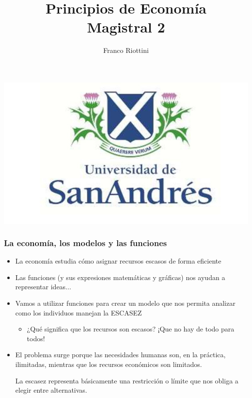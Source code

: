 \documentclass{beamer}
\title[Principios de Economía]{Principios de Economía \vspace{4mm}
\\ Magistral 2}
\date{}
\author[Franco Riottini]{Franco Riottini}
\institute[]{Universidad de San Andrés}
\begin{document}
\begin{frame}
\titlepage
\centering
\includegraphics[scale=0.2]{../Figures/logoUDESA.jpg} 
\end{frame}


\begin{frame}
\frametitle{La economía, los modelos y las funciones}
\begin{itemize}
    \item La economía estudia cómo asignar recursos escasos de forma eficiente
    \item Las funciones (y sus expresiones matemáticas y gráficas) nos ayudan a representar ideas...
    \item Vamos a utilizar funciones para crear un modelo que nos permita analizar como los individuos manejan la ESCASEZ 
    \begin{itemize}
        \item ¿Qué significa que los recursos son escasos? ¡Que no hay de todo para todos!
    \end{itemize}
    \item El problema surge porque las necesidades humanas son, en la práctica, ilimitadas, mientras que los recursos económicos son limitados. 
    \begin{boxA}
        \begin{center}
        
            La escasez representa básicamente una restricción o límite que nos obliga a elegir entre alternativas.
        
        \end{center}
    \end{boxA} 
\end{itemize} 
\end{frame}
\end{document}
